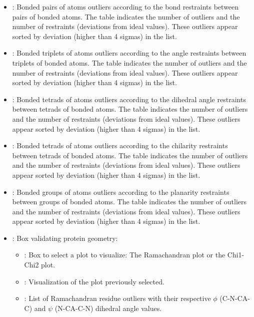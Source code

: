 \begin{itemize}
\begin{itemize}
\begin{itemize}
         \item {}: Bonded pairs of atoms outliers according to the bond restraints between pairs of bonded atoms. The  table indicates the number of outliers and the number of restraints (deviations from ideal values). These outliers appear sorted by deviation (higher than 4 sigmas) in the  list.
         \item {}: Bonded triplets of atoms outliers according to the angle restraints between triplets of bonded atoms. The  table indicates the number of outliers and the number of restraints (deviations from ideal values). These outliers appear sorted by deviation (higher than 4 sigmas) in the  list.
         \item {}: Bonded tetrads of atoms outliers according to the dihedral angle restraints between tetrads of bonded atoms. The  table indicates the number of outliers and the number of restraints (deviations from ideal values). These outliers appear sorted by deviation (higher than 4 sigmas) in the  list.
         \item {}: Bonded tetrads of atoms outliers according to the chilarity restraints between tetrads of bonded atoms. The  table indicates the number of outliers and the number of restraints (deviations from ideal values). These outliers appear sorted by deviation (higher than 4 sigmas) in the  list.
         \item {}: Bonded groups of atoms outliers according to the planarity restraints between groups of bonded atoms. The  table indicates the number of outliers and the number of restraints (deviations from ideal values). These outliers appear sorted by deviation (higher than 4 sigmas) in the  list.
         \item {}: Box validating protein geometry:
         \begin{itemize}
          \item {}: Box to select a plot to visualize: The Ramachandran plot or the Chi1-Chi2 plot.
          \item {}: Visualization of the plot previously selected.
          \item {}: List of Ramachandran residue outliers with their respective $\phi$ (C-N-CA-C) and $\psi$ (N-CA-C-N) dihedral angle values.

\end{itemize}
\end{itemize}
\end{itemize}
\end{itemize}
